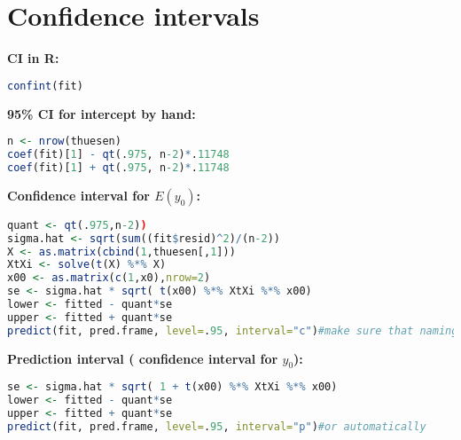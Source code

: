 \section{Confidence intervals}
\textbf{CI in R:} 
\begin{lstlisting}[language=R]
confint(fit)
\end{lstlisting}
\textbf{95\% CI for intercept by hand:} 
\begin{lstlisting}[language=R]
n <- nrow(thuesen)
coef(fit)[1] - qt(.975, n-2)*.11748
coef(fit)[1] + qt(.975, n-2)*.11748
\end{lstlisting}
\textbf{Confidence interval for $E(y_0)$:}
\begin{lstlisting}[language=R]
quant <- qt(.975,n-2))
sigma.hat <- sqrt(sum((fit$resid)^2)/(n-2))
X <- as.matrix(cbind(1,thuesen[,1]))
XtXi <- solve(t(X) %*% X)
x00 <- as.matrix(c(1,x0),nrow=2)
se <- sigma.hat * sqrt( t(x00) %*% XtXi %*% x00)
lower <- fitted - quant*se
upper <- fitted + quant*se
predict(fit, pred.frame, level=.95, interval="c")#make sure that naming when doing pred.frame = data.frame(..) is same as in lm!!\end{lstlisting}
\textbf{Prediction interval ( confidence interval for $y_0$):}
\begin{lstlisting}[language = R]
se <- sigma.hat * sqrt( 1 + t(x00) %*% XtXi %*% x00)
lower <- fitted - quant*se
upper <- fitted + quant*se
predict(fit, pred.frame, level=.95, interval="p")#or automatically
\end{lstlisting}